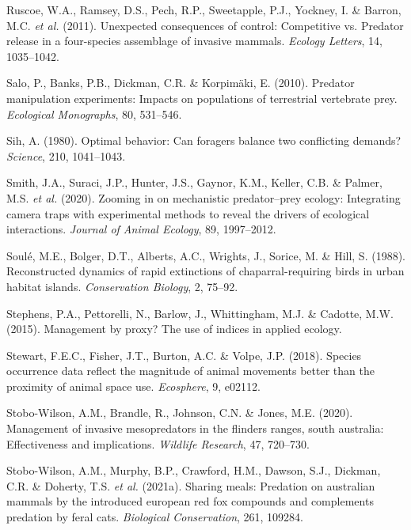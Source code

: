 \documentclass[]{elsarticle} %
\begin{document}
\leavevmode\hypertarget{ref-ruscoe2011}{}%
Ruscoe, W.A., Ramsey, D.S., Pech, R.P., Sweetapple, P.J., Yockney, I. \& Barron, M.C. \emph{et al.} (2011). Unexpected consequences of control: Competitive vs. Predator release in a four-species assemblage of invasive mammals. \emph{Ecology Letters}, 14, 1035--1042.

\leavevmode\hypertarget{ref-https:ux2fux2fdoi.orgux2f10.1890ux2f09-1260.1}{}%
Salo, P., Banks, P.B., Dickman, C.R. \& Korpimäki, E. (2010). Predator manipulation experiments: Impacts on populations of terrestrial vertebrate prey. \emph{Ecological Monographs}, 80, 531--546.

\leavevmode\hypertarget{ref-SIH1041}{}%
Sih, A. (1980). Optimal behavior: Can foragers balance two conflicting demands? \emph{Science}, 210, 1041--1043.

\leavevmode\hypertarget{ref-smith2020}{}%
Smith, J.A., Suraci, J.P., Hunter, J.S., Gaynor, K.M., Keller, C.B. \& Palmer, M.S. \emph{et al.} (2020). Zooming in on mechanistic predator--prey ecology: Integrating camera traps with experimental methods to reveal the drivers of ecological interactions. \emph{Journal of Animal Ecology}, 89, 1997--2012.

\leavevmode\hypertarget{ref-soule1988}{}%
Soulé, M.E., Bolger, D.T., Alberts, A.C., Wrights, J., Sorice, M. \& Hill, S. (1988). Reconstructed dynamics of rapid extinctions of chaparral-requiring birds in urban habitat islands. \emph{Conservation Biology}, 2, 75--92.

\leavevmode\hypertarget{ref-stephens2015}{}%
Stephens, P.A., Pettorelli, N., Barlow, J., Whittingham, M.J. \& Cadotte, M.W. (2015). Management by proxy? The use of indices in applied ecology.

\leavevmode\hypertarget{ref-stewart2018}{}%
Stewart, F.E.C., Fisher, J.T., Burton, A.C. \& Volpe, J.P. (2018). Species occurrence data reflect the magnitude of animal movements better than the proximity of animal space use. \emph{Ecosphere}, 9, e02112.

\leavevmode\hypertarget{ref-stobo2020management}{}%
Stobo-Wilson, A.M., Brandle, R., Johnson, C.N. \& Jones, M.E. (2020). Management of invasive mesopredators in the flinders ranges, south australia: Effectiveness and implications. \emph{Wildlife Research}, 47, 720--730.

\leavevmode\hypertarget{ref-STOBOWILSON2021109284}{}%
Stobo-Wilson, A.M., Murphy, B.P., Crawford, H.M., Dawson, S.J., Dickman, C.R. \& Doherty, T.S. \emph{et al.} (2021a). Sharing meals: Predation on australian mammals by the introduced european red fox compounds and complements predation by feral cats. \emph{Biological Conservation}, 261, 109284.
\end{document}
